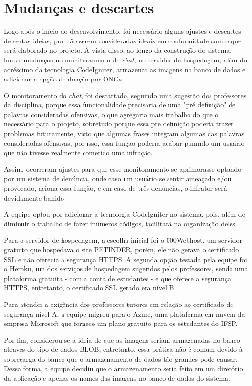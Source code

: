 \section{Mudanças e descartes}
\label{mudancas}
Logo após o início do desenvolvimento, foi necessário alguns ajustes e descartes de certas ideias, por não serem consideradas ideais em conformidade com o que será elaborado no projeto. À vista disso, ao longo da construção do sistema, houve mudanças no monitoramento de \textit{chat}, no servidor de hospedagem, além do acréscimo da tecnologia \gls{CodeIgniter}, armazenar as imagens no banco de dados e adicionar a opção de doação por \gls{ONGs}.

O monitoramento do \textit{chat}, foi descartado, seguindo uma sugestão dos professores da disciplina, porque essa funcionalidade precisaria de uma "pré definição" de palavras consideradas ofensivas, o que agregaria mais trabalho do que o necessário para o projeto, sobretudo porque essa pré definição poderia trazer problemas futuramente, visto que algumas frases integram algumas das palavras consideradas ofensivas, por isso, essa função poderia acabar punindo um usuário que não tivesse realmente cometido uma infração.

Assim, ocorreram ajustes para que esse monitoramento se aprimorasse optando por um sistema de denúncia, onde caso um usuário se sentir ameaçado e/ou provocado, aciona essa função, e em caso de três denúncias, o infrator será devidamente banido

A equipe optou por adicionar a tecnologia \gls{CodeIgniter} no sistema, pois, além de diminuir o trabalho de fazer inúmeros códigos, facilitará na organização deles.

Para o servidor de hospedagem, a escolha inicial foi o \gls{000Webhost}, um servidor gratuito que hospedava o site PETINDER, porém, ele não gerava o certificado \ac{SSL} e não oferecia a segurança \ac{HTTPS}. A segunda opção testada pela equipe foi o \gls{Heroku}, um dos serviços de hospedagem sugeridos pelos professores, sendo uma plataforma gratuita - com a conta de estudantes -  e que oferece a segurança \ac{HTTPS},  entretanto, o certificado \ac{SSL} gerado era nível B. 

Para atender a exigência dos professores tutores em relação ao certificado de segurança nível A, a equipe migrou para o \gls{Azure}, uma plataforma em nuvem da empresa Microsoft que fornece um plano gratuito para os estudantes do \ac{IFSP}. 

Por fim, considerou-se a ideia de que as imagens seriam armazenadas no banco através do tipo de dados \ac{BLOB}, entretanto, essa prática não é comum devido à sobrecarga do banco que o armazenamento de dados tão grandes pode causar. Dessa forma, a equipe decidiu que o armazenamento seria feito em um diretório da aplicação e apenas os nomes das imagens no banco de dados do sistema.


